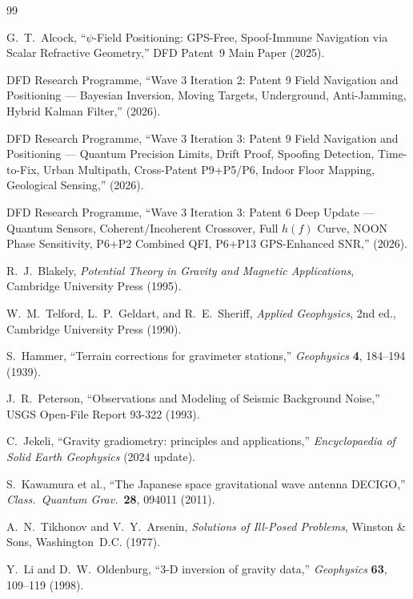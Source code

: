 \documentclass[aps,prd,twocolumn,superscriptaddress,nofootinbib]{revtex4-2}
\begin{document}
\begin{thebibliography}{99}

G.~T.~Alcock,
``$\psi$-Field Positioning: GPS-Free, Spoof-Immune Navigation via
Scalar Refractive Geometry,''
DFD Patent~9 Main Paper (2025).

DFD Research Programme,
``Wave 3 Iteration 2: Patent 9 Field Navigation and Positioning
--- Bayesian Inversion, Moving Targets, Underground,
Anti-Jamming, Hybrid Kalman Filter,''
(2026).

DFD Research Programme,
``Wave 3 Iteration 3: Patent 9 Field Navigation and Positioning
--- Quantum Precision Limits, Drift Proof, Spoofing Detection,
Time-to-Fix, Urban Multipath, Cross-Patent P9+P5/P6,
Indoor Floor Mapping, Geological Sensing,''
(2026).

DFD Research Programme,
``Wave 3 Iteration 3: Patent 6 Deep Update --- Quantum Sensors,
Coherent/Incoherent Crossover, Full $h(f)$ Curve, NOON Phase
Sensitivity, P6+P2 Combined QFI, P6+P13 GPS-Enhanced SNR,''
(2026).

R.~J.~Blakely,
\emph{Potential Theory in Gravity and Magnetic Applications},
Cambridge University Press (1995).

W.~M.~Telford, L.~P.~Geldart, and R.~E.~Sheriff,
\emph{Applied Geophysics}, 2nd ed.,
Cambridge University Press (1990).

S.~Hammer,
``Terrain corrections for gravimeter stations,''
\emph{Geophysics} \textbf{4}, 184--194 (1939).

J.~R.~Peterson,
``Observations and Modeling of Seismic Background Noise,''
USGS Open-File Report 93-322 (1993).

C.~Jekeli,
``Gravity gradiometry: principles and applications,''
\emph{Encyclopaedia of Solid Earth Geophysics} (2024 update).

S.~Kawamura et al.,
``The Japanese space gravitational wave antenna DECIGO,''
\emph{Class.\ Quantum Grav.}\ \textbf{28}, 094011 (2011).

A.~N.~Tikhonov and V.~Y.~Arsenin,
\emph{Solutions of Ill-Posed Problems},
Winston \& Sons, Washington~D.C. (1977).

Y.~Li and D.~W.~Oldenburg,
``3-D inversion of gravity data,''
\emph{Geophysics} \textbf{63}, 109--119 (1998).

\end{thebibliography}
\end{document}
